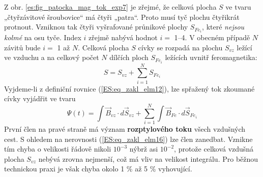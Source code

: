       Z obr.  \ref{es:fig_patocka_mag_tok_exp7} je zřejmé, že celková plocha \(S\) ve tvaru 
      „čtyřzávitové šroubovice“ má čtyři „patra“. Proto musí tyč plochu čtyřikrát protnout. 
      Vzniknou tak čtyři vyšrafované průnikové plochy \(S_{Fe_i}\), které \emph{nejsou kolmé} na 
      osu tyče. Index \(i\) zřejmě nabývá hodnot \(i =\) \numrange{1}{4}. V obecném případě \(N\) 
      závitů bude \(i =\) \num{1} až \(N\). Celková plocha \(S\) cívky se rozpadá na plochu 
      \(S_{vz}\) ležící ve vzduchu a na celkový počet \(N\) dílčích ploch \(S_{Fe_i}\) ležících 
      uvnitř feromagnetika:
      \begin{equation}\label{ES:eq_zakl_elm17}
        S = S_{vz} + \sum\limits_{i=1}^{N}S_{Fe_i} 
      \end{equation}
      Vyjdeme-li z definiční rovnice (\ref{ES:eq_zakl_elm12}), lze spřažený tok zkoumané cívky 
      vyjádřit ve tvaru
      \begin{equation}\label{ES:eq_zakl_elm18}
         \Psi(t) = \int \vec{B}_{vz}\cdot d\vec{S}_{vz} + 
                   \sum_{i=1}^{N}\int\vec{B}_{Fe}\cdot d\vec{S}_{Fe_i}
      \end{equation}
      První člen na pravé straně má význam \textbf{rozptylového toku} všech vzdušných cest. S 
      ohledem na nerovnosti (\ref{ES:eq_zakl_elm16}) lze člen zanedbat. Vznikne tím chyba o 
      velikosti řádově nikoli \(10^{-3}\) nýbrž asi \(10^{-2}\), protože celková vzdušná plocha 
      \(S_{vz}\) nebývá zrovna nejmenší, což má vliv na velikost integrálu. Pro běžnou technickou 
      praxi je však chyba okolo 1 \% až 5 \% vyhovující.
      
